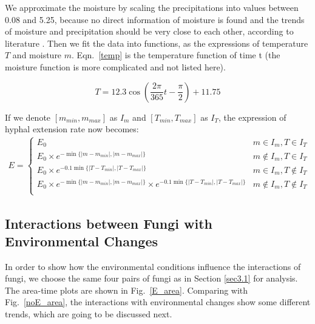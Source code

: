 \documentclass[a4paper,12pt]{article}
\begin{document}
\vspace{-0.2cm}
\par We approximate the moisture by scaling the precipitations into values between 0.08 and 5.25, because no direct information of moisture is found and the trends of moisture and precipitation should be very close to each other, according to literature \cite{mois-pre}. Then we fit the data into functions, as the expressions of temperature $T$ and moisture $m$. Eqn.~\eqref{temp} is the temperature function of time t (the moisture function is more complicated and not listed here). 

\begin{equation}
	\label{temp}
	T=12.3 \cos (\frac{2\pi}{365}t-\frac{\pi}{2})+11.75
\end{equation}

If we denote $[m_{min},m_{max}]$ as $I_m$ and $[T_{min},T_{max}]$ as $I_T$, the expression of hyphal extension rate now becomes:
\begin{eqnarray}
	E=
	\begin{cases}
		E_0 & m \in I_m, T\in I_T\\
		E_0\times e^{-\min\{\vert m-m_{min} \vert, \vert m-m_{max} \vert\}} & m \notin I_m, T\in I_T\\
		E_0\times e^{-0.1\min\{\vert T-T_{min} \vert, \vert T-T_{max} \vert\}} & m \in I_m, T\notin I_T\\
		E_0\times e^{-\min\{\vert m-m_{min} \vert, \vert m-m_{max} \vert\}} \times e^{-0.1\min\{\vert T-T_{min} \vert, \vert T-T_{max} \vert\}} & m \notin I_m, T\notin I_T\\
	\end{cases}
\end{eqnarray}

\subsection{Interactions between Fungi with Environmental Changes}
\par In order to show how the environmental conditions influence the interactions of fungi, we choose the same four pairs of fungi as in Section \ref{sec3.1} for analysis. The area-time plots are shown in Fig.~\ref{E_area}. Comparing with Fig.~\ref{noE_area}, the interactions with environmental changes show some different trends, which are going to be discussed next.
\end{document}

